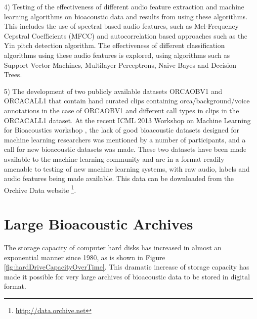 \documentclass[12pt,oneside]{book}
\begin{document}
4) Testing of the effectiveness of different audio feature extraction
and machine learning algorithms on bioacoustic data and results from
using these algorithms.  This includes the use of spectral based audio
features, such as Mel-Frequency Cepstral Coefficients (MFCC) and
autocorrelation based approaches such as the Yin pitch detection
algorithm.  The effectiveness of different classification algorithms
using these audio features is explored, using algorithms such as
Support Vector Machines, Multilayer Perceptrons, Naive Bayes and
Decision Trees.

5) The development of two publicly available datasets ORCAOBV1 and
ORCACALL1 that contain \totalClipsInORCAOBV hand curated clips
containing orca/background/voice annotations in the case of ORCAOBV1
and \totalCallsInORCACALL different call types in \totalClipsInORCACALL
clips in the ORCACALL1 dataset.  At the recent ICML 2013 Workshop on
Machine Learning for Bioacoustics workshop \cite{halkias2013icml4b},
the lack of good bioacoustic datasets designed for machine learning
researchers was mentioned by a number of participants, and a call for
new bioacoustic datasets was made.  These two datasets have been made
available to the machine learning community and are in a format
readily amenable to testing of new machine learning systems, with raw
audio, labels and audio features being made available.  This data can
be downloaded from the Orchive Data
website \footnote{\url{http://data.orchive.net}}.


\section{Large Bioacoustic Archives}

The storage capacity of computer hard disks has increased in almost an
exponential manner since 1980, as is shown in Figure
\ref{fig:hardDriveCapacityOverTime}.  This dramatic increase of
storage capacity has made it possible for very large archives of
bioacoustic data to be stored in digital format.
\end{document}

